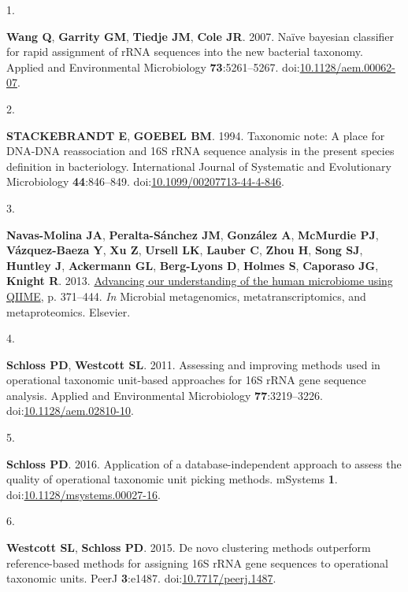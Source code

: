 \documentclass[
  11pt,
]{article}
\newlength{\cslhangindent}
\newlength{\csllabelwidth}
\newenvironment{CSLReferences}[2] %
 {\begin{list}{}{%
  \setlength{\itemindent}{0pt}
  \setlength{\leftmargin}{0pt}
  \setlength{\parsep}{0pt}
  \ifodd #1
   \setlength{\leftmargin}{\cslhangindent}
   \setlength{\itemindent}{-1\cslhangindent}
  \fi
  \setlength{\itemsep}{#2\baselineskip}}}
 {\end{list}}
\newcommand{\CSLLeftMargin}[1]{\parbox[t]{\csllabelwidth}{\strut#1\strut}}
\newcommand{\CSLRightInline}[1]{\parbox[t]{\linewidth - \csllabelwidth}{\strut#1\strut}}
\begin{document}
\label{refs}
\begin{CSLReferences}{0}{1}
\CSLLeftMargin{1. }%
\CSLRightInline{\textbf{Wang Q}, \textbf{Garrity GM}, \textbf{Tiedje
JM}, \textbf{Cole JR}. 2007. Naïve bayesian classifier for rapid
assignment of rRNA sequences into the new bacterial taxonomy. Applied
and Environmental Microbiology \textbf{73}:5261--5267.
doi:\href{https://doi.org/10.1128/aem.00062-07}{10.1128/aem.00062-07}.}

\CSLLeftMargin{2. }%
\CSLRightInline{\textbf{STACKEBRANDT E}, \textbf{GOEBEL BM}. 1994.
Taxonomic note: A place for DNA-DNA reassociation and 16S rRNA sequence
analysis in the present species definition in bacteriology.
International Journal of Systematic and Evolutionary Microbiology
\textbf{44}:846--849.
doi:\href{https://doi.org/10.1099/00207713-44-4-846}{10.1099/00207713-44-4-846}.}

\CSLLeftMargin{3. }%
\CSLRightInline{\textbf{Navas-Molina JA}, \textbf{Peralta-Sánchez JM},
\textbf{González A}, \textbf{McMurdie PJ}, \textbf{Vázquez-Baeza Y},
\textbf{Xu Z}, \textbf{Ursell LK}, \textbf{Lauber C}, \textbf{Zhou H},
\textbf{Song SJ}, \textbf{Huntley J}, \textbf{Ackermann GL},
\textbf{Berg-Lyons D}, \textbf{Holmes S}, \textbf{Caporaso JG},
\textbf{Knight R}. 2013.
\href{https://doi.org/10.1016/b978-0-12-407863-5.00019-8}{Advancing our
understanding of the human microbiome using QIIME}, p. 371--444.
\emph{In} Microbial metagenomics, metatranscriptomics, and
metaproteomics. Elsevier.}

\CSLLeftMargin{4. }%
\CSLRightInline{\textbf{Schloss PD}, \textbf{Westcott SL}. 2011.
Assessing and improving methods used in operational taxonomic unit-based
approaches for 16S rRNA gene sequence analysis. Applied and
Environmental Microbiology \textbf{77}:3219--3226.
doi:\href{https://doi.org/10.1128/aem.02810-10}{10.1128/aem.02810-10}.}

\CSLLeftMargin{5. }%
\CSLRightInline{\textbf{Schloss PD}. 2016. Application of a
database-independent approach to assess the quality of operational
taxonomic unit picking methods. mSystems \textbf{1}.
doi:\href{https://doi.org/10.1128/msystems.00027-16}{10.1128/msystems.00027-16}.}

\CSLLeftMargin{6. }%
\CSLRightInline{\textbf{Westcott SL}, \textbf{Schloss PD}. 2015. De novo
clustering methods outperform reference-based methods for assigning 16S
rRNA gene sequences to operational taxonomic units. PeerJ
\textbf{3}:e1487.
doi:\href{https://doi.org/10.7717/peerj.1487}{10.7717/peerj.1487}.}


\end{CSLReferences}
\end{document}
